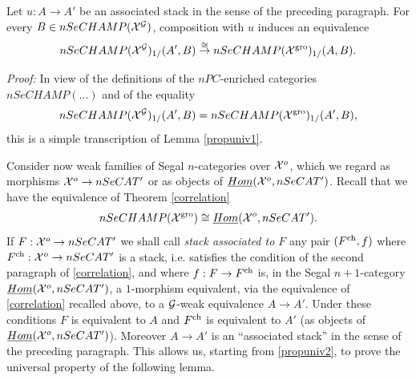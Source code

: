 \begin{lemma}
\label{propuniv2}
Let $u:A\rightarrow A'$ be an associated stack in the sense of the preceding
paragraph.
For every $B\in nSeCHAMP ({\cal X} ^{{\cal G}})$, composition with
$u$ induces an equivalence
$$
nSeCHAMP ({\cal X} ^{{\cal G}})_{1/}(A',B)
\stackrel{\cong}{\rightarrow}
nSeCHAMP ({\cal X} ^{\rm gro})_{1/}(A,B).
$$
\end{lemma}
{\em Proof:}
In view of the definitions of the
$nPC$-enriched categories $nSeCHAMP(\ldots )$
and of the equality
$$
nSeCHAMP ({\cal X} ^{{\cal G}})_{1/}(A',B)=
nSeCHAMP ({\cal X} ^{\rm gro})_{1/}(A',B),
$$
this is a simple transcription of Lemma \ref{propuniv1}.
\eop



Consider now weak families of Segal $n$-categories over ${\cal X} ^o$,
which we regard as morphisms
${\cal X} ^o\rightarrow nSeCAT'$ or as objects of
$\underline{Hom}({\cal X} ^o, nSeCAT')$.
Recall that we have the equivalence
of Theorem \ref{correlation}
$$
nSeCHAMP({\cal X} ^{\rm gro}) \cong \underline{Hom}({\cal X} ^o, nSeCAT').
$$
If $F:{\cal X} ^o\rightarrow nSeCAT'$ we shall call {\em stack associated to
$F$} any pair $(F^{\rm ch}, f)$ where
$F^{\rm ch}:{\cal X} ^o\rightarrow nSeCAT'$ is a stack, i.e. satisfies the condition
of the second paragraph of \ref{correlation}, and where
$f: F \rightarrow F^{\rm ch}$ is, in the Segal $n+1$-category
$\underline{Hom}({\cal X} ^o, nSeCAT')$, a
$1$-morphism
equivalent, via the equivalence of \ref{correlation} recalled
above, to a ${\cal G}$-weak equivalence $A\rightarrow A'$.
Under these conditions $F$ is equivalent to $A$ and $F^{\rm ch}$ is equivalent
to $A'$ (as objects of $\underline{Hom}({\cal X} ^o, nSeCAT')$).
Moreover $A\rightarrow A'$ is an ``associated stack'' in the sense of the
preceding paragraph. This
allows us, starting from \ref{propuniv2}, to prove the
universal property of the following lemma.

